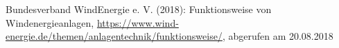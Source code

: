 
\begin{thebibliography}{999}

Bundesverband WindEnergie e. V.  (2018): Funktionsweise von Windenergieanlagen,\newline
\url{https://www.wind-energie.de/themen/anlagentechnik/funktionsweise/},\newline 
abgerufen am 20.08.2018


\end{thebibliography}
